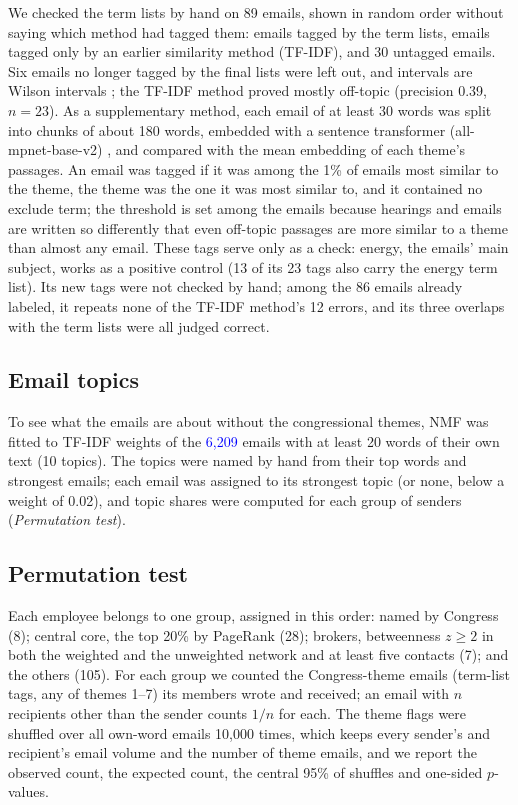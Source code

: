 \documentclass[9pt,twocolumn,twoside]{pnas-new}
\newcommand{\chk}[1]{\textcolor{blue}{#1}}
\begin{document}
We checked the term lists by hand on 89 emails, shown in random order without saying which
method had tagged them: emails tagged by the term lists, emails tagged only by an earlier
similarity method (TF-IDF), and 30 untagged emails. Six emails no longer tagged by the final
lists were left out, and intervals are Wilson intervals \cite{wilson1927}; the TF-IDF method
proved mostly off-topic (precision 0.39, $n = 23$). As a supplementary method, each email of
at least 30 words was split into chunks of about 180 words, embedded with a sentence
transformer (all-mpnet-base-v2) \cite{reimers2019}, and compared with the mean embedding of
each theme's passages. An email was tagged if it was among the 1\% of emails most similar to
the theme, the theme was the one it was most similar to, and it contained no exclude term;
the threshold is set among the emails because hearings and emails are written so differently
that even off-topic passages are more similar to a theme than almost any email. These tags
serve only as a check: energy, the emails' main subject, works as a positive control (13 of
its 23 tags also carry the energy term list). Its new tags were not checked by hand; among the
86 emails already labeled, it repeats none of the TF-IDF method's 12 errors, and its three
overlaps with the term lists were all judged correct.

\subsection*{Email topics}
To see what the emails are about without the congressional themes, NMF was fitted to TF-IDF
weights of the \chk{6,209} emails with at least 20 words of their own text (10 topics). The
topics were named by hand from their top words and strongest emails; each email was assigned to
its strongest topic (or none, below a weight of 0.02), and topic shares were computed for each
group of senders (\textit{Permutation test}).

\subsection*{Permutation test}
Each employee belongs to one group, assigned in this order: named by Congress (8); central
core, the top 20\% by PageRank (28); brokers, betweenness $z \ge 2$ in both the weighted and
the unweighted network and at least five contacts (7); and the others (105). For each group
we counted the Congress-theme emails (term-list tags, any of themes 1--7) its members wrote
and received;
an email with $n$ recipients other than the sender counts $1/n$ for each. The theme flags
were shuffled over all own-word emails 10,000 times, which keeps every sender's and
recipient's email volume and the number of theme emails, and we report the observed count,
the expected count, the central 95\% of shuffles and one-sided $p$-values.
\end{document}
